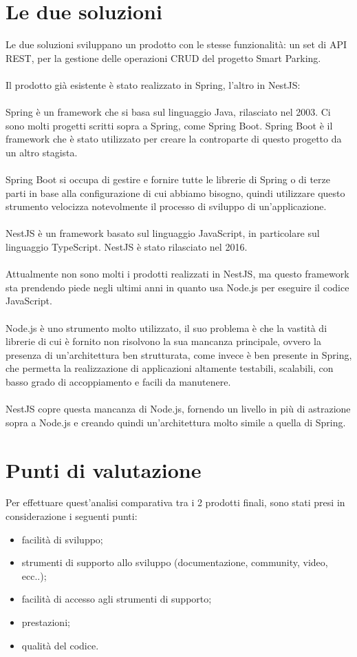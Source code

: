 \section{Le due soluzioni}
Le due soluzioni sviluppano un prodotto con le stesse funzionalità: un set di \gls{API} \gls{REST}, per la gestione delle operazioni \gls{CRUD} del
progetto Smart Parking.
\\\\
Il prodotto già esistente è stato realizzato in Spring, l'altro in NestJS:
\\\\
Spring è un framework che si basa sul linguaggio Java, rilasciato nel 2003. Ci sono molti progetti scritti
sopra a Spring, come Spring Boot. Spring Boot è il framework che è stato utilizzato per creare la controparte 
di questo progetto da un altro stagista.
\\\\
Spring Boot si occupa di gestire
e fornire tutte le librerie di Spring o di terze parti in base alla configurazione di cui abbiamo bisogno, quindi 
utilizzare questo strumento velocizza notevolmente il processo di sviluppo di un'applicazione.
\\\\
NestJS è un framework basato sul linguaggio JavaScript, in particolare sul linguaggio TypeScript. NestJS è
stato rilasciato nel 2016.
\\\\
Attualmente non sono molti i prodotti realizzati in NestJS, ma questo framework sta prendendo piede negli ultimi anni in quanto
usa Node.js per eseguire il codice JavaScript.
\\\\
Node.js è uno strumento molto utilizzato, il suo problema è che la vastità di librerie di cui è fornito non 
risolvono la sua mancanza principale, ovvero la presenza di un'architettura ben strutturata, come invece è ben presente in Spring, che 
permetta la realizzazione di applicazioni altamente testabili, scalabili, con basso grado di accoppiamento
e facili da manutenere.
\\\\
NestJS copre questa mancanza di Node.js, fornendo un livello in più di astrazione sopra a Node.js e creando quindi un'architettura 
molto simile a quella di Spring.

\section{Punti di valutazione}
Per effettuare quest'analisi comparativa tra i 2 prodotti finali, sono stati presi in considerazione i seguenti 
punti:
\begin{itemize}
    \item facilità di sviluppo;
    \item strumenti di supporto allo sviluppo (documentazione, community, video, ecc..);
    \item facilità di accesso agli strumenti di supporto;
    \item prestazioni;
    \item qualità del codice.
\end{itemize}

